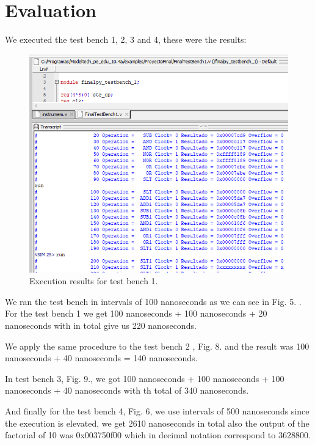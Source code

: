 \documentclass[conference]{IEEEtran}
\begin{document}
\section{Evaluation}
We executed the test bench 1, 2, 3 and 4, these were the results:

\begin{figure}[h]
\includegraphics[scale=0.41]{ModelSim_testbench1_clock_cycles.png}
\caption{Execution results for test bench 1.}
\label{result1}
\end{figure}

We ran the test bench in intervals of 100 nanoseconds as we can see in Fig. 5. \label{result1}. For the 
test bench 1 we get 100 nanoseconds + 100 nanoseconds + 20 nanoseconds with in total 
give us 220 nanoseconds.

We apply the same procedure to the test bench 2  \label{result3}, Fig. 8. and the result was
100 nanoseconds + 40 nanoseconds = 140 nanoseconds.

In test bench 3, Fig. 9., we got 100 nanoseconds + 100 nanoseconds + 100 nanoseconds 
+ 40 nanoseconds with th total of 340 nanoseconds.

And finally for the test bench 4, Fig. 6, we use intervals of 500 nanoseconds since the execution
is elevated, we get 2610 nanoseconds in total also the output of the factorial of 10 was 
0x003750f00 which in decimal notation correspond to 3628800.
\end{document}
